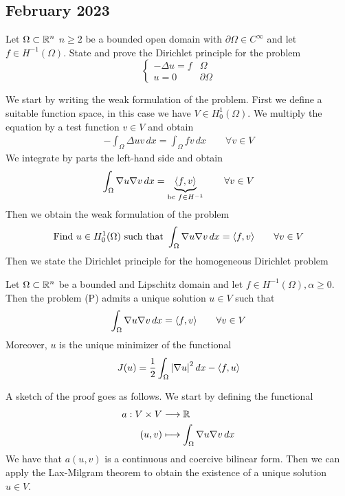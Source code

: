 \newpage
\subsection{February 2023}
\begin{exercise}
    Let \(\Omega \subset \mathbb{R}^n\) \(n \geq 2\) be a bounded open domain with \(\partial\Omega \in C^\infty\) and let \(f \in H^{-1}(\Omega)\). State and prove the Dirichlet principle for the problem
    \[
        \begin{cases}
            -\Delta u = f & \Omega         \\
            u = 0         & \partial\Omega
        \end{cases}
        \tag*{(P)}
    \]
\end{exercise}
We start by writing the weak formulation of the problem. First we define a suitable function space, in this case we have \(V \in H^1_0(\Omega)\). We multiply the equation by a test function \(v \in V\) and obtain
\[
    \begin{split}
        -\int_\Omega \Delta u v \, dx = \int_\Omega f v \, dx \qquad \forall v \in V
    \end{split}
\]
We integrate by parts the left-hand side and obtain
\[
    \begin{split}
        \int_\Omega \nabla u \nabla v \, dx = \underbrace{\langle f, v \rangle}_{\text{bc } f \in H^{-1}} \qquad \forall v \in V
    \end{split}
\]
Then we obtain the weak formulation of the problem
\[
    \begin{split}
        \text{Find } u \in H^1_0(\Omega) \text{ such that } \int_\Omega \nabla u \nabla v \, dx =  \langle f, v \rangle \qquad \forall v \in V
    \end{split}
\]
Then we state the Dirichlet principle for the homogeneous Dirichlet problem
\begin{remark}
    Let \(\Omega \subset \mathbb{R}^n\) be a bounded and Lipschitz domain and let \(f \in H^{-1}(\Omega), \alpha \geq 0\). Then the problem (P) admits a unique solution \(u \in V\) such that
    \[
        \int_\Omega \nabla u \nabla v \, dx = \langle f, v \rangle \qquad \forall v \in V
    \]
    Moreover, \(u\) is the unique minimizer of the functional
    \[
        J(u) = \frac{1}{2} \int_\Omega \abs{\nabla u}^2 \, dx - \langle f, u \rangle
    \]
\end{remark}
A sketch of the proof goes as follows. We start by defining the functional
\begin{align*}
    a: V \times V & \longrightarrow \mathbb{R}                         \\
    (u, v)        & \longmapsto \int_\Omega \nabla u \nabla v \, dx
\end{align*}
We have that \(a(u,v)\) is a continuous and coercive bilinear form. Then we can apply the Lax-Milgram theorem to obtain the existence of a unique solution \(u \in V\).

